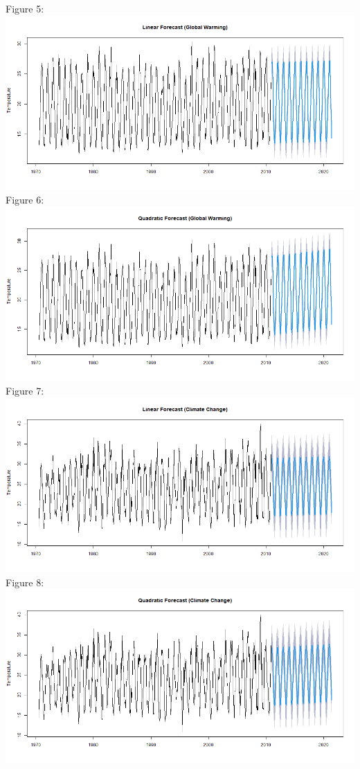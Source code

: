 \documentclass[12pt]{article}
\begin{document}
{Figure 5:\\
\includegraphics[scale=0.5]{Linear GW}\\
Figure 6:\\
\includegraphics[scale=0.5]{Quadratic GW}\\
Figure 7:\\
\includegraphics[scale=0.5]{Linear CC}\\
Figure 8:\\
\includegraphics[scale=0.5]{Quadratic CC}\\
}
\end{document}
